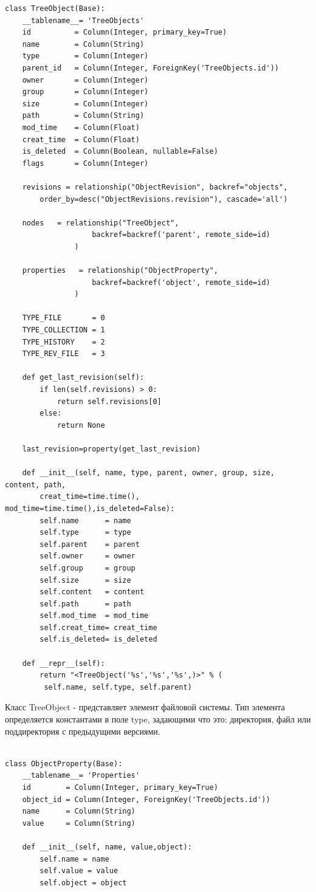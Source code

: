 \documentclass[utf8,usehyperref,12pt]{G7-32}
\begin{document}
\begin{verbatim}
class TreeObject(Base):
    __tablename__= 'TreeObjects'
    id          = Column(Integer, primary_key=True)
    name        = Column(String)
    type        = Column(Integer)
    parent_id   = Column(Integer, ForeignKey('TreeObjects.id'))
    owner       = Column(Integer)
    group       = Column(Integer)
    size        = Column(Integer)    
    path        = Column(String)
    mod_time    = Column(Float)
    creat_time  = Column(Float)
    is_deleted  = Column(Boolean, nullable=False)
    flags       = Column(Integer)
    
    revisions = relationship("ObjectRevision", backref="objects", 
    	order_by=desc("ObjectRevisions.revision"), cascade='all')
    
    nodes   = relationship("TreeObject",
                    backref=backref('parent', remote_side=id)
                )   
  
    properties   = relationship("ObjectProperty",
                    backref=backref('object', remote_side=id)
                )
    
    TYPE_FILE       = 0
    TYPE_COLLECTION = 1
    TYPE_HISTORY    = 2
    TYPE_REV_FILE   = 3
    
    def get_last_revision(self):
        if len(self.revisions) > 0:
            return self.revisions[0]
        else:
            return None
    
    last_revision=property(get_last_revision)

    def __init__(self, name, type, parent, owner, group, size, content, path,
        creat_time=time.time(), mod_time=time.time(),is_deleted=False):
        self.name      = name
        self.type      = type
        self.parent    = parent
        self.owner     = owner
        self.group     = group
        self.size      = size
        self.content   = content
        self.path      = path
        self.mod_time  = mod_time
        self.creat_time= creat_time
        self.is_deleted= is_deleted

    def __repr__(self):
        return "<TreeObject('%s','%s','%s',)>" % (
         self.name, self.type, self.parent)

\end{verbatim}

Класс TreeObject - представляет элемент файловой системы. Тип элемента определяется константами в поле type, задающими что это: директория, файл или поддиректория с предыдущими версиями. 

\begin{verbatim}

class ObjectProperty(Base):
    __tablename__= 'Properties'
    id        = Column(Integer, primary_key=True)
    object_id = Column(Integer, ForeignKey('TreeObjects.id'))
    name      = Column(String)
    value     = Column(String) 
    
    def __init__(self, name, value,object):
        self.name = name
        self.value = value
        self.object = object
\end{verbatim}
\end{document}
